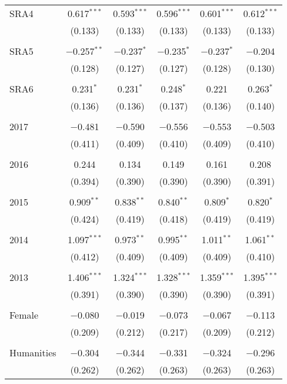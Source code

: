 \begin{table}[H]
\begin{adjustbox}{width=\textwidth, totalheight=\baselineskip}
\begin{tabular}{@{\extracolsep{5pt}}lccccc}
 SRA4 & 0.617$^{***}$ & 0.593$^{***}$ & 0.596$^{***}$ & 0.601$^{***}$ & 0.612$^{***}$ \\ 
  & (0.133) & (0.133) & (0.133) & (0.133) & (0.133) \\ 
  & & & & & \\ 
 SRA5 & $-$0.257$^{**}$ & $-$0.237$^{*}$ & $-$0.235$^{*}$ & $-$0.237$^{*}$ & $-$0.204 \\ 
  & (0.128) & (0.127) & (0.127) & (0.128) & (0.130) \\ 
  & & & & & \\ 
 SRA6 & 0.231$^{*}$ & 0.231$^{*}$ & 0.248$^{*}$ & 0.221 & 0.263$^{*}$ \\ 
  & (0.136) & (0.136) & (0.137) & (0.136) & (0.140) \\ 
  & & & & & \\ 
 2017 & $-$0.481 & $-$0.590 & $-$0.556 & $-$0.553 & $-$0.503 \\ 
  & (0.411) & (0.409) & (0.410) & (0.409) & (0.410) \\ 
  & & & & & \\ 
 2016 & 0.244 & 0.134 & 0.149 & 0.161 & 0.208 \\ 
  & (0.394) & (0.390) & (0.390) & (0.390) & (0.391) \\ 
  & & & & & \\ 
 2015 & 0.909$^{**}$ & 0.838$^{**}$ & 0.840$^{**}$ & 0.809$^{*}$ & 0.820$^{*}$ \\ 
  & (0.424) & (0.419) & (0.418) & (0.419) & (0.419) \\ 
  & & & & & \\ 
 2014 & 1.097$^{***}$ & 0.973$^{**}$ & 0.995$^{**}$ & 1.011$^{**}$ & 1.061$^{**}$ \\ 
  & (0.412) & (0.409) & (0.409) & (0.409) & (0.410) \\ 
  & & & & & \\ 
 2013 & 1.406$^{***}$ & 1.324$^{***}$ & 1.328$^{***}$ & 1.359$^{***}$ & 1.395$^{***}$ \\ 
  & (0.391) & (0.390) & (0.390) & (0.390) & (0.391) \\ 
  & & & & & \\ 
 Female & $-$0.080 & $-$0.019 & $-$0.073 & $-$0.067 & $-$0.113 \\ 
  & (0.209) & (0.212) & (0.217) & (0.209) & (0.212) \\ 
  & & & & & \\ 
 Humanities & $-$0.304 & $-$0.344 & $-$0.331 & $-$0.324 & $-$0.296 \\ 
  & (0.262) & (0.262) & (0.263) & (0.263) & (0.263) \\ 

\end{tabular}
\end{adjustbox}
\end{table}
